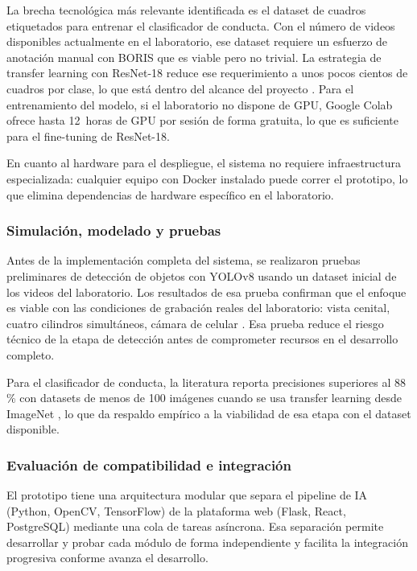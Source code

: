La brecha tecnológica más relevante identificada es el dataset de cuadros etiquetados
para entrenar el clasificador de conducta. Con el número de videos disponibles actualmente
en el laboratorio, ese dataset requiere un esfuerzo de anotación manual con BORIS que
es viable pero no trivial. La estrategia de transfer learning con ResNet-18 reduce ese
requerimiento a unos pocos cientos de cuadros por clase, lo que está dentro del alcance
del proyecto \cite{pan2010,meng2024_dsaan}. Para el entrenamiento del modelo, si el
laboratorio no dispone de GPU, Google Colab ofrece hasta 12~horas de GPU por sesión de
forma gratuita, lo que es suficiente para el fine-tuning de ResNet-18.

En cuanto al hardware para el despliegue, el sistema no requiere infraestructura
especializada: cualquier equipo con Docker instalado puede correr el prototipo, lo que
elimina dependencias de hardware específico en el laboratorio.

\subsubsection{Simulación, modelado y pruebas}

Antes de la implementación completa del sistema, se realizaron pruebas preliminares de
detección de objetos con YOLOv8 usando un dataset inicial de los videos del laboratorio.
Los resultados de esa prueba confirman que el enfoque es viable con las condiciones de
grabación reales del laboratorio: vista cenital, cuatro cilindros simultáneos, cámara de
celular \cite{stadler2024_yolov8}. Esa prueba reduce el riesgo técnico de la etapa de
detección antes de comprometer recursos en el desarrollo completo.

Para el clasificador de conducta, la literatura reporta precisiones superiores al
88\,\% con datasets de menos de 100 imágenes cuando se usa transfer learning desde
ImageNet \cite{meng2024_dsaan}, lo que da respaldo empírico a la viabilidad de esa
etapa con el dataset disponible.

\subsubsection{Evaluación de compatibilidad e integración}

El prototipo tiene una arquitectura modular que separa el pipeline de IA (Python,
OpenCV, TensorFlow) de la plataforma web (Flask, React, PostgreSQL) mediante una
cola de tareas asíncrona. Esa separación permite desarrollar y probar cada módulo de
forma independiente y facilita la integración progresiva conforme avanza el desarrollo.

